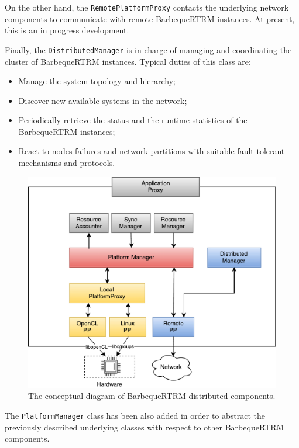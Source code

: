 On the other hand, the \texttt{RemotePlatformProxy} contacts the underlying
network components to communicate with remote BarbequeRTRM instances.
At present, this is an in progress development.

Finally, the \texttt{DistributedManager} is in charge of managing and
coordinating the cluster of BarbequeRTRM instances. Typical duties of
this class are:
\begin{itemize}
\item Manage the system topology and hierarchy;
\item Discover new available systems in the network;
\item Periodically retrieve the status and the runtime statistics of the BarbequeRTRM
instances;
\item React to nodes failures and network partitions with suitable
fault-tolerant mechanisms and protocols.
\end{itemize}

\begin{figure}[t]
    \centerline 
{\includegraphics[scale=0.6]{img/cap5-conc-diag.pdf}}
    \caption[BarbequeRTRM distributed components]{The conceptual diagram of BarbequeRTRM distributed components.}
    \label{fig:cap5-conc-diag}
\end{figure}

The \texttt{PlatformManager} class has been also added in order to abstract the
previously described underlying classes with respect to other BarbequeRTRM
components.

